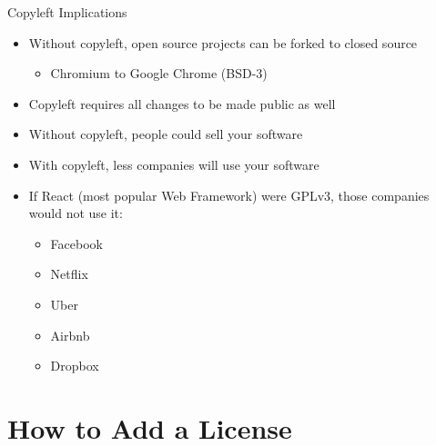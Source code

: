 \documentclass[compress,aspectratio=169]{beamer}
\begin{document}
  \begin{frame}{Copyleft Implications}
    \begin{itemize}
      \item Without copyleft, open source projects can be forked to closed source
        \begin{itemize}
          \item Chromium to Google Chrome (BSD-3)
        \end{itemize}
      \item Copyleft requires all changes to be made public as well
      \item Without copyleft, people could sell your software
      \item With copyleft, less companies will use your software
      \item If React (most popular Web Framework) were GPLv3, those companies would not use it:
        \begin{itemize}
          \item Facebook
          \item Netflix
          \item Uber
          \item Airbnb
          \item Dropbox
        \end{itemize}
    \end{itemize}
  \end{frame}

\section{How to Add a License}
\end{document}

